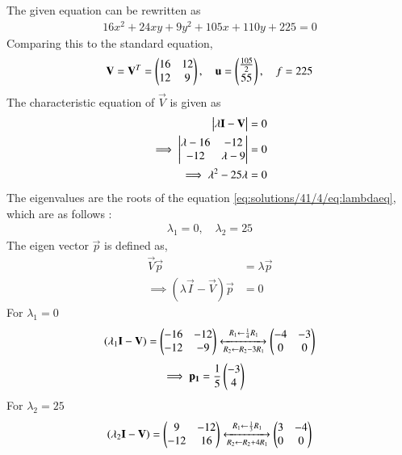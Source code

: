 %
The given equation can be rewritten as
\begin{align}\label{eq:solutions/41/4/eq:quadraticparabola}
    16x^2+24xy+9y^2+105x+110y+225 = 0
\end{align}
Comparing this to the standard equation,
\begin{align}
    \mathbf{V} = \mathbf{V}^T = \begin{pmatrix}16 & 12\\12 & 9\end{pmatrix}, \quad \mathbf{u} = \begin{pmatrix}\frac{105}{2} \\ 55\end{pmatrix}, \quad f = 225 \label{eq:solutions/41/4/eq:Vufvals}
\end{align}
The characteristic equation of $\vec{V}$ is given as
\begin{align}
    \begin{vmatrix}\lambda\mathbf{I}-\mathbf{V}\end{vmatrix} = 0\\
    \implies \begin{vmatrix}\lambda-16 & -12 \\ -12 & \lambda-9\end{vmatrix} = 0\\
    \implies \lambda^2 -25\lambda = 0 \label{eq:solutions/41/4/eq:lambdaeq}
\end{align}
The eigenvalues are the roots of the equation \eqref{eq:solutions/41/4/eq:lambdaeq}, which are as follows :
\begin{align}
    \lambda_1 = 0, \quad \lambda_2 = 25 \label{eq:solutions/41/4/eq:eigenval}
\end{align}
The eigen vector $\vec{p}$ is defined as, 
\begin{align}
    \vec{V}\vec{p} &= \lambda\vec{p}\\
    \implies(\lambda\vec{I}-\vec{V})\vec{p}&=0
\end{align}
For $\lambda_1=0$
\begin{align}
    (\lambda_1\mathbf{I}-\mathbf{V}) = \begin{pmatrix}-16 & -12\\-12 & -9\end{pmatrix}\xleftrightarrow[R_2\leftarrow R_2-3R_1]{R_1\leftarrow \frac{1}{4}R_1}\begin{pmatrix}-4 & -3\\0 & 0\end{pmatrix}
\end{align}
\begin{align}
    \implies\mathbf{p_1}&=\frac{1}{5}\begin{pmatrix}-3\\4\end{pmatrix}\label{eq:solutions/41/4/eq:p1val}
\end{align}
For $\lambda_2=25$
\begin{align}
    (\lambda_2\mathbf{I}-\mathbf{V}) = \begin{pmatrix}9 & -12\\-12 & 16\end{pmatrix}\xleftrightarrow[R_2\leftarrow R_2+4R_1]{R_1\leftarrow \frac{1}{3}R_1}\begin{pmatrix}3 & -4\\0 & 0\end{pmatrix}
\end{align}

